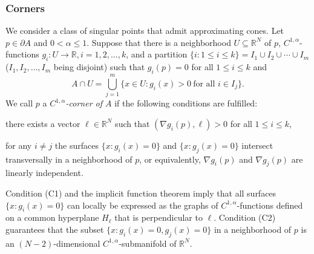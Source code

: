 \documentclass[graybox]{svmult}
\newcommand{\R}{\mathbb{R}}  %
\renewcommand{\AA}{A}  %
\newcommand{\pp}{p}
\begin{document}



\subsubsection{Corners} 
We consider a class of singular points that admit approximating cones. 
Let $\pp \in \partial\AA$ and $0<\alpha \le 1$. Suppose that there is a  neighborhood $U \subseteq \R^N$ of $\pp$, $C^{1,\alpha}$-functions $g_i\colon U \to \R, i=1,2,\dots, k$, and a partition $\{i: 1\le i \le k\} = I_1 \cup I_2 \cup \cdots \cup I_m$ ($I_1,I_2,\dots, I_m$ being disjoint) such that 
$g_i(\pp)=0$ for all $1\le i \le k$ and 
\begin{equation}\label{eq:MF}
 \AA \cap U = \bigcup_{j=1}^m \{x \in U: g_i(x)>0~\text{for all $i\in I_j$}\}. 
\end{equation}
We call $\pp$ a \emph{$C^{1,\alpha}$-corner of $\AA$} if the following conditions are fulfilled: 
\begin{description}[($\kappa1$)]
\item[(C1)]{there exists a vector $\ell \in \R^N$ such that $(\nabla g_i(\pp),\ell)>0$ for all $1\le i \le k$,}  
\item[(C2)]{for any $i\ne j$ the surfaces $\{x: g_i(x)=0\}$ and $\{x: g_j(x)=0\}$ intersect transversally in a neighborhood of $\pp$, or equivalently, $\nabla g_i(\pp)$ and $\nabla g_j(\pp)$ are linearly independent. } 
\end{description}
Condition (C1) and the implicit function theorem imply that all surfaces $\{x: g_i(x)=0\}$ can locally be expressed as the graphs of $C^{1,\alpha}$-functions defined on a common hyperplane $H_\ell$ that is perpendicular to $\ell$. Condition (C2) guarantees that the subset $\{x: g_i(x) =0, g_j(x)=0\}$ in a neighborhood of $\pp$ is an $(N-2)$-dimensional $C^{1,\alpha}$-submanifold of $\R^N$. 
\end{document}
